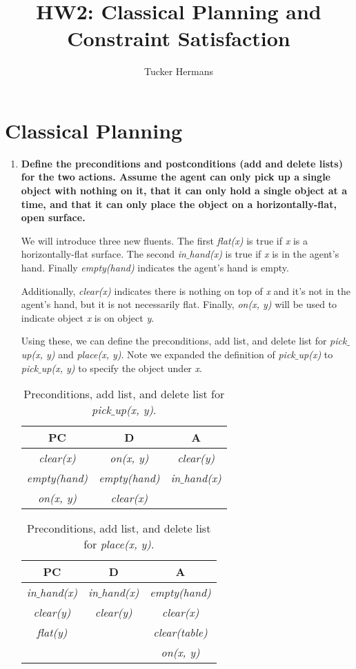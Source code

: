 \documentclass[11pt, letterpaper]{hw}
\title{HW2: Classical Planning and Constraint Satisfaction}
\institute{University of Utah}
\author{Tucker Hermans}
\begin{document}
\maketitle
\section{Classical Planning}
\begin{enumerate}
\item \textbf{Define the preconditions and postconditions (add and delete lists) for the two actions. Assume the agent can only pick up a single object with nothing on it, that it can only hold a single object at a time, and that it can only place the object on a horizontally-flat, open surface.}

We will introduce three new fluents. The first \textit{flat(x)} is true if \textit{x} is a horizontally-flat surface. The second \textit{in$\_$hand(x)} is true if \textit{x} is in the agent's hand. Finally \textit{empty(hand)} indicates the agent's hand is empty.

Additionally, \textit{clear(x)} indicates there is nothing on top of \textit{x} and it's not in the agent's hand, but it is not necessarily flat. Finally, \textit{on(x, y)} will be used to indicate object \textit{x} is on object \textit{y}.

Using these, we can define the preconditions, add list, and delete list for \textit{pick$\_$up(x, y)} and \textit{place(x, y)}. Note we expanded the definition of \textit{pick$\_$up(x)} to \textit{pick$\_$up(x, y)} to specify the object under \textit{x}.

\begin{table}[H]
\centering
{\renewcommand{\arraystretch}{1.2}%
\begin{tabular}{| c | c | c |}
\hline
\textbf{PC} & \textbf{D} & \textbf{A}\\
\hline
\textit{clear(x)} & \textit{on(x, y)} & \textit{clear(y)}\\ \hline
\textit{empty(hand)} & \textit{empty(hand)} & \textit{in$\_$hand(x)}\\ \hline
\textit{on(x, y)} & \textit{clear(x)} &  \\ \hline
\end{tabular}}
\caption{Preconditions, add list, and delete list for \textit{pick$\_$up(x, y)}.}
\end{table}

\begin{table}[H]
\centering
{\renewcommand{\arraystretch}{1.2}%
\begin{tabular}{| c | c | c |}
\hline
\textbf{PC} & \textbf{D} & \textbf{A}\\
\hline
\textit{in$\_$hand(x)} & \textit{in$\_$hand(x)} & \textit{empty(hand)}\\ \hline
\textit{clear(y)} & \textit{clear(y)} & \textit{clear(x)}\\ \hline
\textit{flat(y)} &  & \textit{clear(table)} \\ \hline
 & & \textit{on(x, y)} \\ \hline
\end{tabular}}
\caption{Preconditions, add list, and delete list for \textit{place(x, y)}.}
\end{table}


\end{enumerate}
\end{document}
